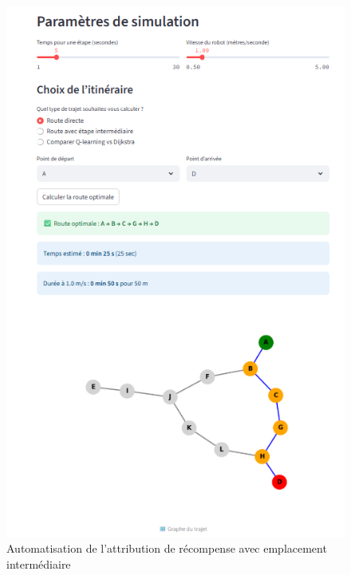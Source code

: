 \documentclass{article}
\begin{document}
\begin{figure}[htbp]
  \centering
  \begin{minipage}[b]{0.45\textwidth}
    \centering
    \includegraphics[width=\textwidth]{image5.png}
    \caption{Automatisation de l'attribution de récompense avec emplacement intermédiaire}
    \label{fig:Automatisation de l'attribution de récompense avec emplacement intermédiaire}
  \end{minipage}
  \hfill
  \begin{minipage}[b]{0.45\textwidth}
    \centering

\end{minipage}
\end{figure}
\end{document}

